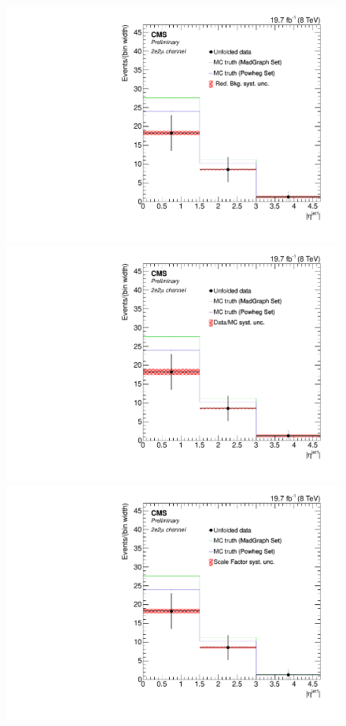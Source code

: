 \begin{figure}[hbtp]
\begin{center}
   \includegraphics[width=0.8\cmsFigWidth]{Figures/Unfolding/Systematics/ZZTo2e2m_EtaJet1_RedBkg_Mad_fr}     
   \includegraphics[width=0.8\cmsFigWidth]{Figures/Unfolding/Systematics/ZZTo2e2m_EtaJet1_UnfDataOverGenMC_Mad_fr}     
   \includegraphics[width=0.8\cmsFigWidth]{Figures/Unfolding/Systematics/ZZTo2e2m_EtaJet1_SFSq_Mad_fr}

\end{center}
\end{figure}

